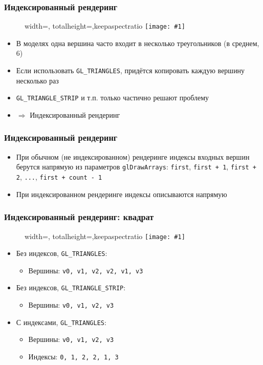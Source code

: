 \documentclass{beamer}
\newcommand{\slideimage}[1]{
  \begin{figure}
    \begin{adjustbox}{width=\textwidth, totalheight=\textheight-2\baselineskip-2\baselineskip,keepaspectratio}
      \texttt{[image: \#1]}
    \end{adjustbox}
  \end{figure}
}
\begin{document}
\begin{frame}[fragile]
\frametitle{Индексированный рендеринг}
\slideimage{spheres.png}
\begin{itemize}
\item В моделях одна вершина часто входит в несколько треугольников (в среднем, 6)
\pause
\item Если использовать \verb|GL_TRIANGLES|, придётся копировать каждую вершину несколько раз
\pause
\item \verb|GL_TRIANGLE_STRIP| и т.п. только частично решают проблему
\pause
\item \begin{math}\Rightarrow\end{math} Индексированный рендеринг
\end{itemize}
\end{frame}

\begin{frame}[fragile]
\frametitle{Индексированный рендеринг}
\begin{itemize}
\item При обычном (не индексированном) рендеринге индексы входных вершин берутся напрямую из параметров \verb|glDrawArrays|: \verb|first|, \verb|first + 1|, \verb|first + 2|, \verb|...|, \verb|first + count - 1|
\pause
\item При индексированном рендеринге индексы описываются напрямую
\end{itemize}
\end{frame}

\begin{frame}[fragile]
\frametitle{Индексированный рендеринг: квадрат}
\slideimage{quad.png}
\pause
\begin{itemize}
\item Без индексов, \verb|GL_TRIANGLES|:
\begin{itemize}
\item Вершины: \verb|v0, v1, v2, v2, v1, v3|
\end{itemize}
\pause
\item Без индексов, \verb|GL_TRIANGLE_STRIP|:
\begin{itemize}
\item Вершины: \verb|v0, v1, v2, v3|
\end{itemize}
\pause
\item С индексами, \verb|GL_TRIANGLES|:
\begin{itemize}
\item Вершины: \verb|v0, v1, v2, v3|
\item Индексы: \verb|0, 1, 2, 2, 1, 3|
\end{itemize}
\end{itemize}
\end{frame}
\end{document}

